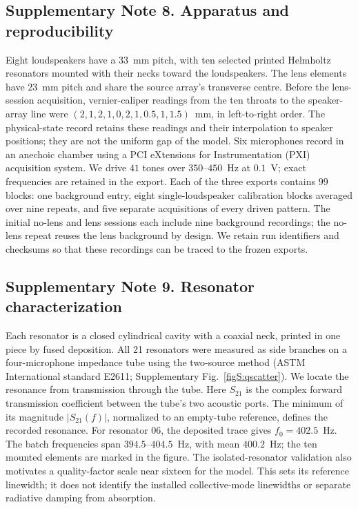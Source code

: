 \documentclass[pdflatex,sn-nature]{sn-jnl}%
\begin{document}
\subsection*{Supplementary Note 8. Apparatus and reproducibility}

Eight loudspeakers have a $33$~mm pitch, with ten selected printed
Helmholtz resonators mounted with their necks toward the loudspeakers. The lens elements have $23$~mm pitch and share the source array's transverse centre. Before the lens-session acquisition, vernier-caliper readings from the ten throats to the speaker-array line were $(2,1,2,1,0,2,1,0.5,1,1.5)$~mm, in left-to-right order. The physical-state record retains these readings and their interpolation to speaker positions; they are not the uniform gap of the model. Six microphones record in
an anechoic chamber using a PCI eXtensions for Instrumentation (PXI) acquisition system. We drive $41$ tones over
$350$--$450$~Hz at $0.1$~V; exact frequencies are retained in the export.
Each of the three exports contains $99$ blocks: one background entry,
eight single-loudspeaker calibration blocks averaged over nine repeats,
and five separate acquisitions of every driven pattern.
The initial no-lens and lens sessions each include nine background recordings;
the no-lens repeat reuses the lens background by design.
We retain run identifiers and checksums so that these recordings can be traced to the frozen exports.

\subsection*{Supplementary Note 9. Resonator characterization}

Each resonator is a closed cylindrical cavity with a coaxial neck,
printed in one piece by fused deposition. All 21 resonators were measured
as side branches on a four-microphone impedance tube using the two-source
method (ASTM International standard E2611; Supplementary Fig.~\ref{figS:qscatter}).
We locate the resonance from transmission through the tube. Here $S_{21}$ is the complex forward transmission coefficient between
the tube's two acoustic ports. The minimum of its magnitude $|S_{21}(f)|$, normalized to
an empty-tube reference, defines the recorded resonance.
For resonator 06, the deposited trace gives $f_0=402.5$~Hz.
The batch frequencies span $394.5$--$404.5$~Hz, with mean $400.2$~Hz;
the ten mounted elements are marked in the figure.
The isolated-resonator validation also motivates a quality-factor scale near sixteen for the model. This sets its reference linewidth; it does not identify the installed collective-mode linewidths or separate radiative damping from absorption.
\end{document}

